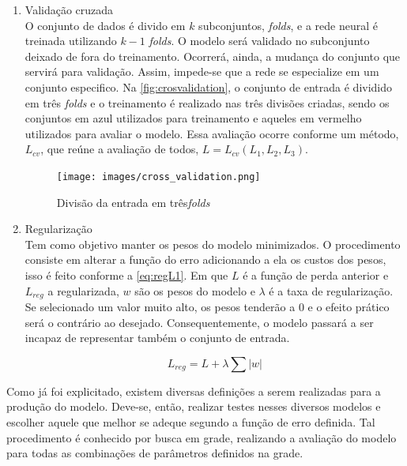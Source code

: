 \documentclass[
    12pt,
    oneside,
    a4paper,
    english,
    brazil
]{abntex2}
\begin{document}
\begin{enumerate}
    \item Validação cruzada\\
        O conjunto de  dados é divido em $k$ subconjuntos,  \textit{folds}, e a
        rede neural é  treinada utilizando $k-1$ \textit{folds}.  O modelo será
        validado  no  subconjunto deixado  de  fora  do treinamento.  Ocorrerá,
        ainda,  a  mudança  do  conjunto que  servirá  para  validação.  Assim,
        impede-se  que a  rede se  especialize  em um  conjunto especifico.  Na
        \autoref{fig:crosvalidation}, o conjunto de  entrada é dividido em três
        \textit{folds} e o  treinamento é realizado nas  três divisões criadas,
        sendo os  conjuntos em  azul utilizados para  treinamento e  aqueles em
        vermelho  utilizados  para  avaliar  o modelo.  Essa  avaliação  ocorre
        conforme um  método, $L_{cv}$,  que reúne  a avaliação  de todos,  $L =
        L_{cv}(L_1, L_2, L_3)$.

        \begin{figure}[ht]
            \centering
            \caption{Divisão da entrada em três\textit{folds}}\label{fig:crosvalidation}
            \texttt{[image: images/cross\_validation.png]}
        \end{figure}

    \item Regularização\\
        Tem como objetivo manter os pesos do modelo minimizados. O procedimento
        consiste em  alterar a função do  erro adicionando a ela  os custos dos
        pesos,  isso é  feito conforme  a \autoref{eq:regL1}.  Em que  $L$ é  a
        função de perda  anterior e $L_{reg}$ a regularizada, $w$  são os pesos
        do modelo  e $\lambda$  é a  taxa de  regularização. Se  selecionado um
        valor muito  alto, os pesos  tenderão a $0$ e  o efeito prático  será o
        contrário ao desejado. Consequentemente, o modelo passará a ser incapaz
        de representar também o conjunto de entrada.

        \begin{equation}\label{eq:regL1}
            L_{reg} = L + \lambda \sum{|w|}
        \end{equation}
\end{enumerate}

Como já foi explicitado, existem diversas  definições a serem realizadas para a
produção do modelo.  Deve-se, então, realizar testes nesses  diversos modelos e
escolher aquele  que melhor se  adeque segundo a  função de erro  definida. Tal
procedimento é conhecido  por busca em grade, realizando a  avaliação do modelo
para todas as combinações de parâmetros definidos na grade.
\end{document}
